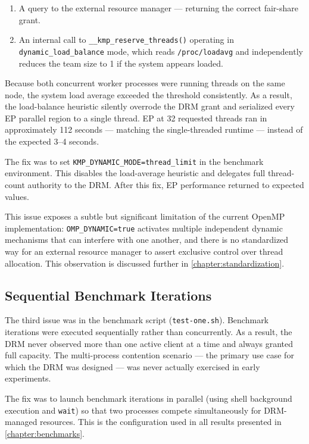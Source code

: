 \begin{enumerate}
  \item A query to the external resource manager --- returning the correct fair-share grant.
  \item An internal call to \texttt{\_\_kmp\_reserve\_threads()} operating in \texttt{dynamic\_load\_balance} mode, which reads \texttt{/proc/loadavg} and independently reduces the team size to 1 if the system appears loaded.
\end{enumerate}

Because both concurrent worker processes were running threads on the same node, the system load average exceeded the threshold consistently. As a result, the load-balance heuristic silently overrode the DRM grant and serialized every EP parallel region to a single thread. EP at 32 requested threads ran in approximately 112 seconds --- matching the single-threaded runtime --- instead of the expected 3--4 seconds.

The fix was to set \texttt{KMP\_DYNAMIC\_MODE=thread\_limit} in the benchmark environment. This disables the load-average heuristic and delegates full thread-count authority to the DRM\@. After this fix, EP performance returned to expected values.

This issue exposes a subtle but significant limitation of the current OpenMP implementation: \texttt{OMP\_DYNAMIC=true} activates multiple independent dynamic mechanisms that can interfere with one another, and there is no standardized way for an external resource manager to assert exclusive control over thread allocation. This observation is discussed further in \autoref{chapter:standardization}.

\subsection{Sequential Benchmark Iterations}

The third issue was in the benchmark script (\texttt{test-one.sh}). Benchmark iterations were executed sequentially rather than concurrently. As a result, the DRM never observed more than one active client at a time and always granted full capacity. The multi-process contention scenario --- the primary use case for which the DRM was designed --- was never actually exercised in early experiments.

The fix was to launch benchmark iterations in parallel (using shell background execution and \texttt{wait}) so that two processes compete simultaneously for DRM-managed resources. This is the configuration used in all results presented in \autoref{chapter:benchmarks}.

